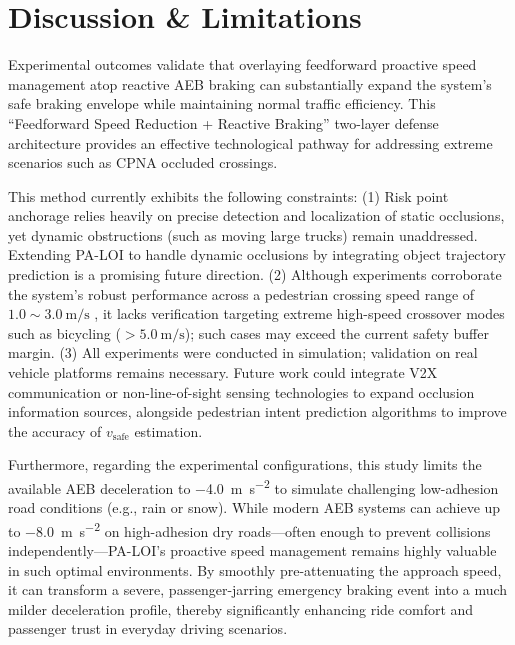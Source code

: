 \documentclass[conference]{IEEEtran}
\begin{document}
\section{Discussion \& Limitations}

Experimental outcomes validate that overlaying feedforward proactive speed management atop reactive AEB braking can substantially expand the system's safe braking envelope while maintaining normal traffic efficiency. This ``Feedforward Speed Reduction + Reactive Braking'' two-layer defense architecture provides an effective technological pathway for addressing extreme scenarios such as CPNA occluded crossings.

This method currently exhibits the following constraints: (1) Risk point anchorage relies heavily on precise detection and localization of static occlusions, yet dynamic obstructions (such as moving large trucks) remain unaddressed. Extending PA-LOI to handle dynamic occlusions by integrating object trajectory prediction is a promising future direction. (2) Although experiments corroborate the system's robust performance across a pedestrian crossing speed range of $1.0\sim\SI{3.0}{\meter\per\second}$ , it lacks verification targeting extreme high-speed crossover modes such as bicycling ($>\SI{5.0}{\meter\per\second}$); such cases may exceed the current safety buffer margin. (3) All experiments were conducted in simulation; validation on real vehicle platforms remains necessary. Future work could integrate V2X communication or non-line-of-sight sensing technologies to expand occlusion information sources, alongside pedestrian intent prediction algorithms to improve the accuracy of $v_{\text{safe}}$ estimation.

Furthermore, regarding the experimental configurations, this study limits the available AEB deceleration to \SI{-4.0}{\meter\per\second\squared} to simulate challenging low-adhesion road conditions (e.g., rain or snow). While modern AEB systems can achieve up to \SI{-8.0}{\meter\per\second\squared} on high-adhesion dry roads---often enough to prevent collisions independently---PA-LOI's proactive speed management remains highly valuable in such optimal environments. By smoothly pre-attenuating the approach speed, it can transform a severe, passenger-jarring emergency braking event into a much milder deceleration profile, thereby significantly enhancing ride comfort and passenger trust in everyday driving scenarios.
\end{document}
